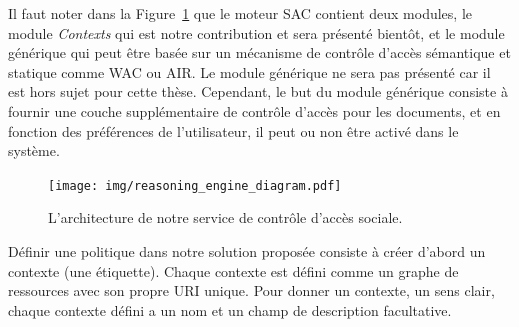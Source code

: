 Il faut noter dans la Figure~\ref{fig:acs_architecture_fr} que le moteur SAC contient deux modules, le module \textit{Contexts} qui est notre contribution et sera présenté bientôt, et le module générique qui peut être basée sur un mécanisme de contrôle d'accès sémantique et statique comme WAC ou AIR. Le module générique ne sera pas présenté car il est hors sujet pour cette thèse. Cependant, le but du module générique consiste à fournir une couche supplémentaire de contrôle d'accès pour les documents, et en fonction des préférences de l'utilisateur, il peut ou non être activé dans le système.\\


\begin{figure}[h]
  \begin{center}
    \texttt{[image: img/reasoning\_engine\_diagram.pdf]}
        \caption{L'architecture de notre service de contrôle d'accès sociale.}
        \label{fig:acs_architecture_fr}
  \end{center}
\end{figure}

Définir une politique dans notre solution proposée consiste à créer d'abord un contexte (une étiquette). Chaque contexte est défini comme un graphe de ressources avec son propre URI unique. Pour donner un contexte, un sens clair, chaque contexte défini a un nom et un champ de description facultative.\\


